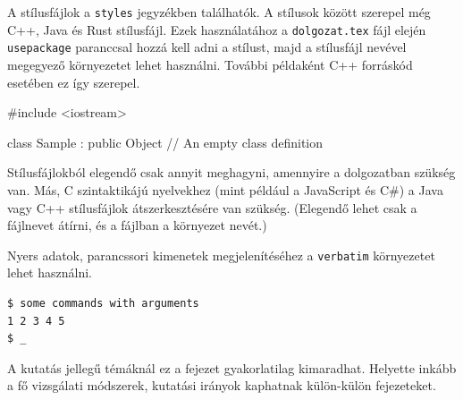 A stílusfájlok a \texttt{styles} jegyzékben találhatók.
A stílusok között szerepel még C++, Java és Rust stílusfájl.
Ezek használatához a \texttt{dolgozat.tex} fájl elején \texttt{usepackage} paranccsal hozzá kell adni a stílust, majd a stílusfájl nevével megegyező környezetet lehet használni.
További példaként C++ forráskód esetében ez így szerepel.
\begin{cpp}
#include <iostream>

class Sample : public Object
{
    // An empty class definition
}
\end{cpp}
Stílusfájlokból elegendő csak annyit meghagyni, amennyire a dolgozatban szükség van.
Más, C szintaktikájú nyelvekhez (mint például a JavaScript és C\#) a Java vagy C++ stílusfájlok átszerkesztésére van szükség.
(Elegendő lehet csak a fájlnevet átírni, és a fájlban a környezet nevét.)

Nyers adatok, parancssori kimenetek megjelenítéséhez a \texttt{verbatim} környezetet lehet használni.
\begin{verbatim}
$ some commands with arguments
1 2 3 4 5
$ _
\end{verbatim}

A kutatás jellegű témáknál ez a fejezet gyakorlatilag kimaradhat.
Helyette inkább a fő vizsgálati módszerek, kutatási irányok kaphatnak külön-külön fejezeteket.
